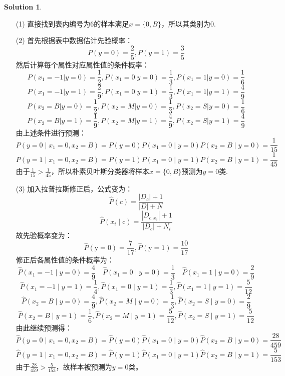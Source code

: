 \documentclass[a4paper,UTF8]{article}
\theoremstyle{definition}
\newtheorem*{solution}{Solution}
\begin{document}
\begin{solution}
	\begin{enumerate}
		\item [(1)] 直接找到表内编号为6的样本满足$x=\{0,B\}$，所以其类别为0.
		\item [(2)] 首先根据表中数据估计先验概率：
		      \[P(y=0)=\frac{2}{5},P(y=1) = \frac{3}{5}\]
		      然后计算每个属性对应属性值的条件概率：
		      \[P(x_1=-1|y=0) = \frac{1}{2},P(x_1=0|y=0)=\frac{1}{3},P(x_1=1|y=0)=\frac{1}{6}\]
		      \[P(x_1=-1|y=1)=\frac{2}{9},P(x_1=0|y=1)=\frac{1}{3},P(x_1=1|y=1)=\frac{4}{9}\]
		      \[P(x_2=B|y=0)=\frac{1}{2},P(x_2=M|y=0)=\frac{1}{3},P(x_2=S|y=0)=\frac{1}{6}\]
		      \[P(x_2=B|y=1)=\frac{1}{9},P(x_2=M|y=1)=\frac{4}{9},P(x_2=S|y=1)=\frac{4}{9}\]
		      由上述条件进行预测：
		      \[P\left(y=0 \mid x_{1}=0, x_{2}=B\right)=P(y=0) P\left(x_{1}=0 \mid y=0\right) P\left(x_{2}=B \mid y=0\right)=\frac{1}{15}\]
		      \[P\left(y=1 \mid x_{1}=0, x_{2}=B\right)=P(y=1) P\left(x_{1}=0 \mid y=1\right) P\left(x_{2}=B \mid y=1\right)=\frac{1}{45}\]
		      由于$\frac{1}{15}>\frac{1}{45}$，所以朴素贝叶斯分类器将样本$x=\{0,B\}$预测为$y=0$类.
		\item [(3)]加入拉普拉斯修正后，公式变为：
		      \[\hat{P}(c)=\frac{\left|D_{c}\right|+1}{|D|+N}\]
		      \[\hat{P}\left(x_{i} \mid \mathrm{c}\right)=\frac{\left|D_{c,x_{i}}\right|+1}{\left|D_{c}\right|+N_{i}}\]
		      故先验概率变为：
		      \[\hat{P}(\mathrm{y}=0)=\frac{7}{17}, \hat{P}(\mathrm{y}=1)=\frac{10}{17} \]
		      修正后各属性值的条件概率为：
		      \[\hat{P}\left(x_{1}=-1 \mid y=0\right)=\frac{4}{9} \quad \hat{P}\left(x_{1}=0 \mid y=0\right)=\frac{1}{3} \quad \hat{P}\left(x_{1}=1 \mid y=0\right)=\frac{2}{9}\]
		      \[\hat{P}\left(x_{1}=-1 \mid y=1\right)=\frac{1}{4}, \hat{P}\left(x_{1}=0 \mid y=1\right)=\frac{1}{3}, \hat{P}\left(x_{1}=1 \mid y=1\right)=\frac{5}{12}\]
		      \[\hat{P}\left(x_{2}=B \mid y=0\right)=\frac{4}{9}, \hat{P}\left(x_{2}=M \mid y=0\right)=\frac{1}{3}, \hat{P}\left(x_{2}=S \mid y=0\right)=\frac{2}{9}\]
		      \[\hat{P}\left(x_{2}=B \mid y=1\right)=\frac{1}{6}, \hat{P}\left(x_{2}=M \mid y=1\right)=\frac{5}{12}, \hat{P}\left(x_{2}=S \mid y=1\right)=\frac{5}{12}\]
		      由此继续预测得：
		      \[\hat{P}\left(y=0 \mid x_{1}=0, x_{2}=B\right)=\hat{P}(y=0) \hat{P}\left(x_{1}=0 \mid y=0\right) \hat{P}\left(x_{2}=B \mid y=0\right)=\frac{28}{459} \]
		      \[\hat{P}\left(y=1 \mid x_{1}=0, x_{2}=B\right)=\hat{P}(y=1) \hat{P}\left(x_{1}=0 \mid y=1\right) \hat{P}\left(x_{2}=B \mid y=1\right)=\frac{5}{153}\]
		      由于$\frac{28}{459}>\frac{5}{153}$，故样本被预测为$y=0$类。
	\end{enumerate}
\end{solution}
\end{document}
